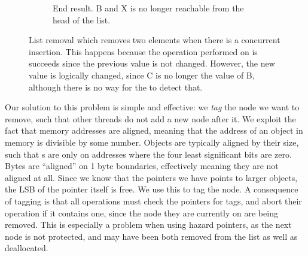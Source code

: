 \documentclass[b5paper]{report}
\begin{document}
\begin{figure}[ht]
  \begin{subfigure}[b]{\textwidth}
      \centering
      \caption{End result. B and X is no longer reachable from the head of the
        list.\label{fig:list-remove-c}}
  \end{subfigure}
  \caption{List removal which removes two elements when there is a concurrent
  insertion. This happens because the  operation
  performed on  is succeeds since the previous value is not
  changed.  However, the new value is logically changed, since C is no longer
  the  value of B, although there is no way for the  to
  detect that.\label{fig:list-remove}} \end{figure}

Our solution to this problem is simple and effective: we \emph{tag} the node we
want to remove, such that other threads do not add a new node after it. We
exploit the fact that memory addresses are aligned, meaning that the address of
an object in memory is divisible by some number. Objects are typically aligned
by their size, such that s are only on addresses where the four least
significant bits are zero. Bytes are ``aligned'' on 1 byte boundaries,
effectively meaning they are not aligned at all. Since we know that the pointers
we have points to larger objects, the LSB of the pointer itself is free. We use
this to tag the node. A consequence of tagging is that all operations must check
the  pointers for tags, and abort their operation if it contains one,
since the node they are currently on are being removed. This is especially a
problem when using hazard pointers, as the next node is not protected, and may
have been both removed from the list as well as deallocated.
\end{document}
